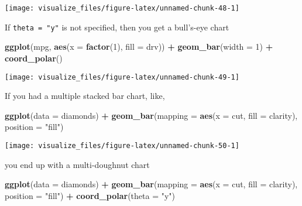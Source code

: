 \documentclass[]{book}
\newenvironment{Shaded}{\begin{snugshade}}{\end{snugshade}}
\newcommand{\DataTypeTok}[1]{\textcolor[rgb]{0.13,0.29,0.53}{#1}}
\newcommand{\DecValTok}[1]{\textcolor[rgb]{0.00,0.00,0.81}{#1}}
\newcommand{\KeywordTok}[1]{\textcolor[rgb]{0.13,0.29,0.53}{\textbf{#1}}}
\newcommand{\NormalTok}[1]{#1}
\newcommand{\OperatorTok}[1]{\textcolor[rgb]{0.81,0.36,0.00}{\textbf{#1}}}
\newcommand{\StringTok}[1]{\textcolor[rgb]{0.31,0.60,0.02}{#1}}
\theoremstyle{definition}
\theoremstyle{definition}
\theoremstyle{definition}
\theoremstyle{remark}
\begin{document}
\begin{center}\texttt{[image: visualize\_files/figure-latex/unnamed-chunk-48-1]} \end{center}

If \texttt{theta\ =\ "y"} is not specified, then you get a bull's-eye
chart

\begin{Shaded}
\begin{Highlighting}[]
\KeywordTok{ggplot}\NormalTok{(mpg, }\KeywordTok{aes}\NormalTok{(}\DataTypeTok{x =} \KeywordTok{factor}\NormalTok{(}\DecValTok{1}\NormalTok{), }\DataTypeTok{fill =}\NormalTok{ drv)) }\OperatorTok{+}
\StringTok{  }\KeywordTok{geom_bar}\NormalTok{(}\DataTypeTok{width =} \DecValTok{1}\NormalTok{) }\OperatorTok{+}
\StringTok{  }\KeywordTok{coord_polar}\NormalTok{()}
\end{Highlighting}
\end{Shaded}

\begin{center}\texttt{[image: visualize\_files/figure-latex/unnamed-chunk-49-1]} \end{center}

If you had a multiple stacked bar chart, like,

\begin{Shaded}
\begin{Highlighting}[]
\KeywordTok{ggplot}\NormalTok{(}\DataTypeTok{data =}\NormalTok{ diamonds) }\OperatorTok{+}\StringTok{ }
\StringTok{  }\KeywordTok{geom_bar}\NormalTok{(}\DataTypeTok{mapping =} \KeywordTok{aes}\NormalTok{(}\DataTypeTok{x =}\NormalTok{ cut, }\DataTypeTok{fill =}\NormalTok{ clarity), }\DataTypeTok{position =} \StringTok{"fill"}\NormalTok{)}
\end{Highlighting}
\end{Shaded}

\begin{center}\texttt{[image: visualize\_files/figure-latex/unnamed-chunk-50-1]} \end{center}

you end up with a multi-doughnut chart

\begin{Shaded}
\begin{Highlighting}[]
\KeywordTok{ggplot}\NormalTok{(}\DataTypeTok{data =}\NormalTok{ diamonds) }\OperatorTok{+}\StringTok{ }
\StringTok{  }\KeywordTok{geom_bar}\NormalTok{(}\DataTypeTok{mapping =} \KeywordTok{aes}\NormalTok{(}\DataTypeTok{x =}\NormalTok{ cut, }\DataTypeTok{fill =}\NormalTok{ clarity), }\DataTypeTok{position =} \StringTok{"fill"}\NormalTok{) }\OperatorTok{+}
\StringTok{  }\KeywordTok{coord_polar}\NormalTok{(}\DataTypeTok{theta =} \StringTok{"y"}\NormalTok{)}
\end{Highlighting}
\end{Shaded}
\end{document}
